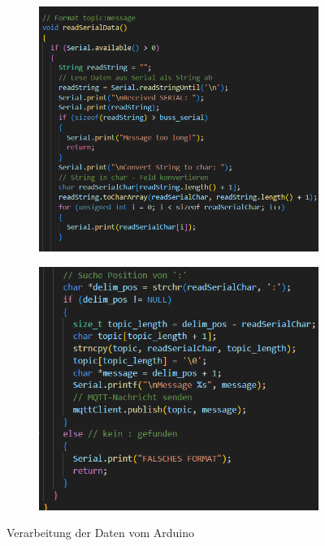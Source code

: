 \documentclass[12pt, letterpaper]{article}
\begin{document}
\begin{figure}[h]
  \begin{subfigure}[b]{0.45\textwidth}
    \centering
    \includegraphics[width=\textwidth]{readSerial2.png}
  \end{subfigure}
  \begin{subfigure}[b]{0.45\textwidth}
    \centering
    \includegraphics[width=\textwidth]{readSerial1.png}
  \end{subfigure}
  \caption{Verarbeitung der Daten vom Arduino}
  \label{abb:readserial}
\end{figure}
\end{document}
